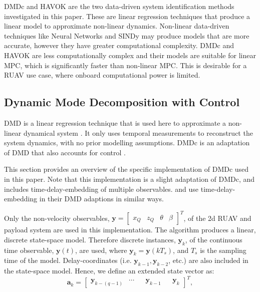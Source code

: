         DMDc and HAVOK are the two data-driven system identification methods investigated in this paper. 
        These are linear regression techniques that produce a linear model to approximate non-linear dynamics.
        Non-linear data-driven techniques like Neural Networks and SINDy \cite{Brunton2016} may produce models that are more accurate, however they have greater computational complexity.
        DMDc and HAVOK are less computationally complex and their models are suitable for linear MPC, which is significantly faster than non-linear MPC.
        This is desirable for a RUAV use case, where onboard computational power is limited.
%
    \subsection{Dynamic Mode Decomposition with Control} \label{sec:dmdc}
% 
    \par
    DMD is a linear regression technique that is used here to approximate a non-linear dynamical system \cite{Tu2014}.
    It only uses temporal measurements to reconstruct the system dynamics, with no prior modelling assumptions.
    DMDc is an adaptation of DMD that also accounts for control \cite{Proctor2016}.
% 
    \par
    This section provides an overview of the specific implementation of DMDc used in this paper.
    Note that this implementation is a slight adaptation of DMDc, and includes time-delay-embedding of multiple observables. 
    \cite{Korda2018} and \cite{Arbabi2017} use time-delay-embedding in their DMD adaptions in similar ways.
% 
    \par
    Only the non-velocity observables,
    $\bm{y} = \begin{bmatrix}
        x_Q & z_Q & \theta & \beta
    \end{bmatrix}^T$,
    of the \gls{2d} RUAV and payload system are used in this implementation.
    The algorithm produces a linear, discrete state-space model.
    Therefore discrete instances, $\bm{y}_k$, of the continuous time observable, $\bm{y}(t)$, are used, where $\bm{y}_k = \bm{y}(k T_s)$, and $T_s$ is the sampling time of the model.    
    Delay-coordinates (i.e. $\bm{y}_{k-1}, \bm{y}_{k-2}$, etc.) are also included in the state-space model.
    Hence, we define an extended state vector as:
    \begin{equation}
         \bm{a}_{k} = \begin{bmatrix} \bm{y}_{k-(q-1)} & \cdots & & \bm{y}_{k-1} & & \bm{y}_{k} \end{bmatrix}^T ,
    \end{equation}
